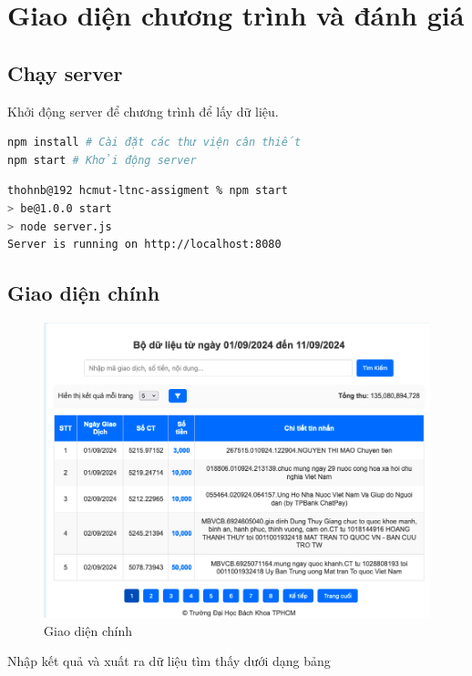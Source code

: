 \section{Giao diện chương trình và đánh giá}
\subsection{Chạy server}
Khởi động server để chương trình để lấy dữ liệu. 
\begin{lstlisting}[language=bash, caption=Khởi động server]
npm install # Cài đặt các thư viện cân thiết
npm start # Khởi động server

\end{lstlisting}


\begin{lstlisting}[language=bash,caption="Server đã chạy thành công"]
thohnb@192 hcmut-ltnc-assigment % npm start
> be@1.0.0 start
> node server.js
Server is running on http://localhost:8080
\end{lstlisting}

\subsection{Giao diện chính}
\begin{figure}[!ht]
\includegraphics[width=15cm]{Images/img/main_screen_2.png}
\caption{Giao diện chính}
\end{figure}
\newpage
Nhập kết quả và xuất ra dữ liệu tìm thấy dưới dạng bảng


